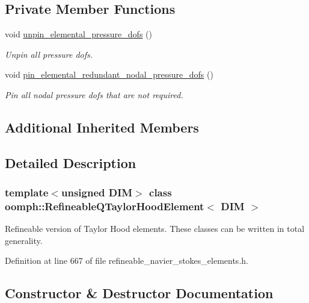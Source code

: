 \subsection*{Private Member Functions}
\begin{DoxyCompactItemize}
\item 
void \hyperlink{classoomph_1_1RefineableQTaylorHoodElement_a130b113b3de095ab4f17e18f3659c84a}{unpin\+\_\+elemental\+\_\+pressure\+\_\+dofs} ()
\begin{DoxyCompactList}\small\item\em Unpin all pressure dofs. \end{DoxyCompactList}\item 
void \hyperlink{classoomph_1_1RefineableQTaylorHoodElement_a38bdcf951d151c1d29cf8f908278c1a4}{pin\+\_\+elemental\+\_\+redundant\+\_\+nodal\+\_\+pressure\+\_\+dofs} ()
\begin{DoxyCompactList}\small\item\em Pin all nodal pressure dofs that are not required. \end{DoxyCompactList}\end{DoxyCompactItemize}
\subsection*{Additional Inherited Members}


\subsection{Detailed Description}
\subsubsection*{template$<$unsigned D\+IM$>$\newline
class oomph\+::\+Refineable\+Q\+Taylor\+Hood\+Element$<$ D\+I\+M $>$}

Refineable version of Taylor Hood elements. These classes can be written in total generality. 

Definition at line 667 of file refineable\+\_\+navier\+\_\+stokes\+\_\+elements.\+h.



\subsection{Constructor \& Destructor Documentation}
\mbox{\label{classoomph_1_1RefineableQTaylorHoodElement_a27b2f11524ac177ef5b7643e6f61a4d7}} 
